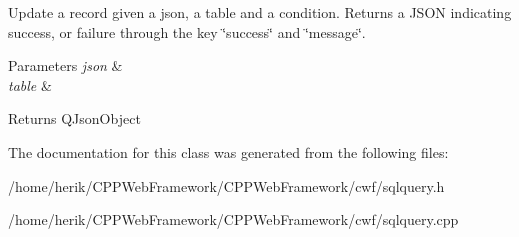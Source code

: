 Update a record given a json, a table and a condition. Returns a J\+S\+ON indicating success, or failure through the key \char`\"{}success\char`\"{} and \char`\"{}message\char`\"{}. 


\begin{DoxyParams}{Parameters}
{\em json} & \\
\hline
{\em table} & \\
\hline
\end{DoxyParams}
\begin{DoxyReturn}{Returns}
Q\+Json\+Object 
\end{DoxyReturn}


The documentation for this class was generated from the following files\+:\begin{DoxyCompactItemize}
\item 
/home/herik/\+C\+P\+P\+Web\+Framework/\+C\+P\+P\+Web\+Framework/cwf/sqlquery.\+h\item 
/home/herik/\+C\+P\+P\+Web\+Framework/\+C\+P\+P\+Web\+Framework/cwf/sqlquery.\+cpp\end{DoxyCompactItemize}
